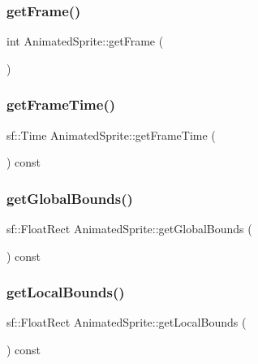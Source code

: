 \subsubsection{\texorpdfstring{get\+Frame()}{getFrame()}}
{\footnotesize\ttfamily int Animated\+Sprite\+::get\+Frame (\begin{DoxyParamCaption}{ }\end{DoxyParamCaption})}

\hypertarget{class_animated_sprite_a5291f8e24fe2c6e4284bc7ff9499ef77}{}\label{class_animated_sprite_a5291f8e24fe2c6e4284bc7ff9499ef77} 
\subsubsection{\texorpdfstring{get\+Frame\+Time()}{getFrameTime()}}
{\footnotesize\ttfamily sf\+::\+Time Animated\+Sprite\+::get\+Frame\+Time (\begin{DoxyParamCaption}{ }\end{DoxyParamCaption}) const}

\hypertarget{class_animated_sprite_a86dca0906c53b3e630aaeac2f0085a0e}{}\label{class_animated_sprite_a86dca0906c53b3e630aaeac2f0085a0e} 
\subsubsection{\texorpdfstring{get\+Global\+Bounds()}{getGlobalBounds()}}
{\footnotesize\ttfamily sf\+::\+Float\+Rect Animated\+Sprite\+::get\+Global\+Bounds (\begin{DoxyParamCaption}{ }\end{DoxyParamCaption}) const}

\hypertarget{class_animated_sprite_ac4c88435c8698f452629c5cd78bfb3c9}{}\label{class_animated_sprite_ac4c88435c8698f452629c5cd78bfb3c9} 
\subsubsection{\texorpdfstring{get\+Local\+Bounds()}{getLocalBounds()}}
{\footnotesize\ttfamily sf\+::\+Float\+Rect Animated\+Sprite\+::get\+Local\+Bounds (\begin{DoxyParamCaption}{ }\end{DoxyParamCaption}) const}

